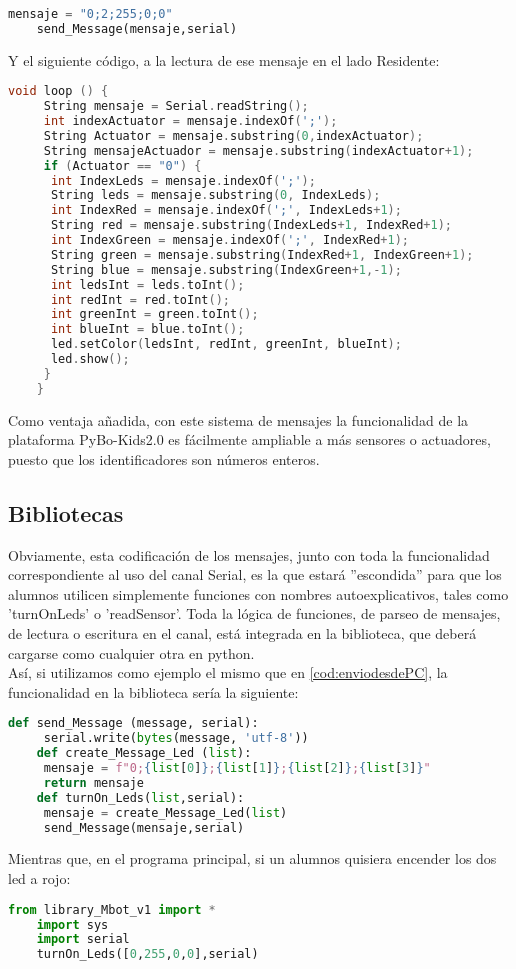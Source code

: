 \begin{lstlisting}[language=python,caption={Envío de un mensaje desde el Programa PC},captionpos=b,label=cod:enviodesdePC]	
	mensaje = "0;2;255;0;0"
	send_Message(mensaje,serial)
\end{lstlisting}

Y el siguiente código, a la lectura de ese mensaje en el lado Residente:
\begin{lstlisting}[language=C,caption={Lectura del mensaje en el lado Arduino},captionpos=b]	
	void loop () {
	 String mensaje = Serial.readString();
	 int indexActuator = mensaje.indexOf(';');
	 String Actuator = mensaje.substring(0,indexActuator);
	 String mensajeActuador = mensaje.substring(indexActuator+1);
	 if (Actuator == "0") {
	  int IndexLeds = mensaje.indexOf(';');
	  String leds = mensaje.substring(0, IndexLeds);
	  int IndexRed = mensaje.indexOf(';', IndexLeds+1); 
	  String red = mensaje.substring(IndexLeds+1, IndexRed+1);
	  int IndexGreen = mensaje.indexOf(';', IndexRed+1);
	  String green = mensaje.substring(IndexRed+1, IndexGreen+1);
	  String blue = mensaje.substring(IndexGreen+1,-1);
	  int ledsInt = leds.toInt();
	  int redInt = red.toInt();
	  int greenInt = green.toInt();
	  int blueInt = blue.toInt();
	  led.setColor(ledsInt, redInt, greenInt, blueInt);
	  led.show();
	 }
	}
\end{lstlisting}

Como ventaja añadida, con este sistema de mensajes la funcionalidad de la plataforma PyBo-Kids2.0 es fácilmente ampliable a más sensores o actuadores, puesto que los identificadores son números enteros. 
\subsection{Bibliotecas}
Obviamente, esta codificación de los mensajes, junto con toda la funcionalidad correspondiente al uso del canal Serial, es la que estará ''escondida'' para que los alumnos utilicen simplemente funciones con nombres autoexplicativos, tales como 'turnOnLeds' o 'readSensor'. Toda la lógica de funciones, de parseo de mensajes, de lectura o escritura en el canal, está integrada en la biblioteca, que deberá cargarse como cualquier otra en python. \\
Así, si utilizamos como ejemplo el mismo que en \ref{cod:enviodesdePC}, la funcionalidad en la biblioteca sería la siguiente:
\begin{lstlisting}[language=python]	
	def send_Message (message, serial):
	 serial.write(bytes(message, 'utf-8'))
	def create_Message_Led (list):
	 mensaje = f"0;{list[0]};{list[1]};{list[2]};{list[3]}"
	 return mensaje
	def turnOn_Leds(list,serial):
	 mensaje = create_Message_Led(list)
	 send_Message(mensaje,serial)
\end{lstlisting}
Mientras que, en el programa principal, si un alumnos quisiera encender los dos led a rojo:
\begin{lstlisting}[language=python]	
	from library_Mbot_v1 import *
	import sys
	import serial
	turnOn_Leds([0,255,0,0],serial)
\end{lstlisting}

